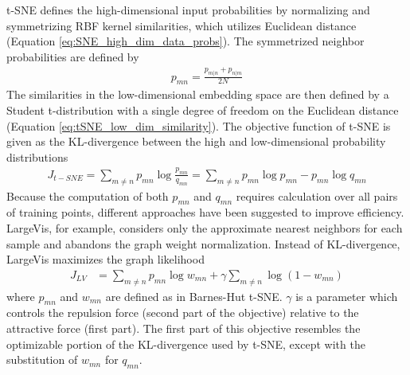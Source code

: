 t-SNE defines the high-dimensional input probabilities by normalizing and symmetrizing RBF kernel similarities, which utilizes Euclidean distance (Equation \ref{eq:SNE_high_dim_data_probs}).  The symmetrized neighbor probabilities are defined by 
\begin{align}
	p_{mn} = \frac{p_{m|n} + p_{n|m}}{2N}
\end{align}
\noindent
The similarities in the low-dimensional embedding space are then defined by a Student t-distribution with a single degree of freedom on the Euclidean distance (Equation \ref{eq:tSNE_low_dim_similarity}).  The objective function of t-SNE is given as the KL-divergence between the high and low-dimensional probability distributions
\begin{align}
	J_{t-SNE} = \sum_{m \neq n} p_{mn} \log{\frac{p_{mn}}{q_{mn}}} = \sum_{m \neq n} p_{mn} \log{p_{mn}} - p_{mn} \log{q_{mn}}
\end{align}
Because the computation of both $p_{mn}$ and $q_{mn}$ requires calculation over all pairs of training points, different approaches have been suggested to improve efficiency.  LargeVis, for example, considers only the approximate nearest neighbors for each sample and abandons the graph weight normalization.  Instead of KL-divergence, LargeVis maximizes the graph likelihood
\begin{align} 
	J_{LV} &= \sum_{m \neq n} p_{mn} \log{w_{mn}} + \gamma \sum_{m \neq n}\log{(1 - w_{mn})}
\end{align}
\noindent
where $p_{mn}$ and $w_{mn}$ are defined as in Barnes-Hut t-SNE.  $\gamma$ is a parameter which controls the repulsion force (second part of the objective) relative to the attractive force (first part).  The first part of this objective resembles the optimizable portion of the KL-divergence used by t-SNE, except with the substitution of $w_{mn}$ for $q_{mn}$.

